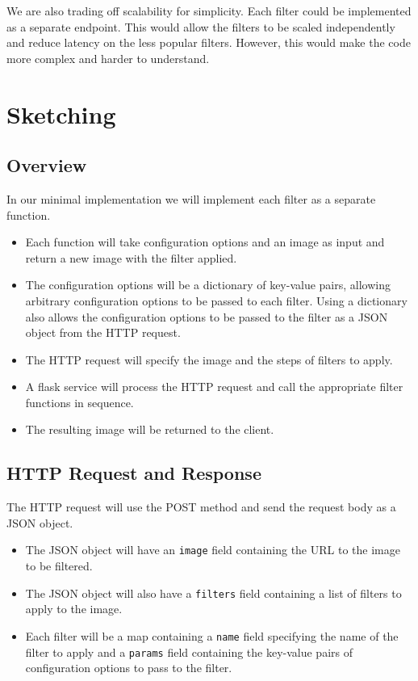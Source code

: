\documentclass{csse4400}
\begin{document}
We are also trading off scalability for simplicity.
Each filter could be implemented as a separate endpoint.
This would allow the filters to be scaled independently and reduce latency on the less popular filters.
However, this would make the code more complex and harder to understand.

\section{Sketching}

\subsection{Overview}
In our minimal implementation we will implement each filter as a separate function.
\begin{itemize}
    \item Each function will take configuration options and an image as input and return a new image with the filter applied.
    \item The configuration options will be a dictionary of key-value pairs, allowing arbitrary configuration options to be passed to each filter.
    Using a dictionary also allows the configuration options to be passed to the filter as a JSON object from the HTTP request.
    \item The HTTP request will specify the image and the steps of filters to apply.
    \item A flask service will process the HTTP request and call the appropriate filter functions in sequence.
    \item The resulting image will be returned to the client.
\end{itemize}

\subsection{HTTP Request and Response}
The HTTP request will use the POST method and send the request body as a JSON object.
\begin{itemize}
    \item The JSON object will have an \texttt{image} field containing the URL to the image to be filtered.
    \item The JSON object will also have a \texttt{filters} field containing a list of filters to apply to the image.
    \item Each filter will be a map containing a \texttt{name} field specifying the name of the filter to apply and a \texttt{params} field containing the key-value pairs of configuration options to pass to the filter.
\end{itemize}
\end{document}
